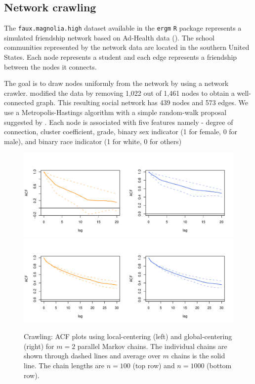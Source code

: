 \documentclass[12pt]{article}
\theoremstyle{remark}
\begin{document}
\subsection{Network crawling}


The \texttt{faux.magnolia.high} dataset available in the \texttt{ergm} \texttt{R} package represents a simulated friendship network based on Ad-Health data (\cite{resnick1997protecting}). The school communities represented by the network data are located in the southern United States. Each node represents a student and each edge represents a friendship between the nodes it connects.

The goal is to draw nodes uniformly from the network by using a network crawler. \cite{nilakanta2019ensuring} modified the data by removing 1,022 out of 1,461 nodes to obtain a well-connected graph. This resulting social network has 439 nodes and 573 edges. We use a Metropolis-Hastings algorithm with a simple random-walk  proposal suggested by \cite{gjoka2011practical}. Each node is associated with five features namely - degree of connection, cluster coefficient, grade, binary sex indicator (1 for female, 0 for male), and binary race indicator (1 for white, 0 for others)

\begin{figure}[htbp]
    \centering
      \includegraphics[width = .6\textwidth]{plots/magnolia-acf_n100.pdf}\\ \vspace{-.5cm}
      \includegraphics[width = .6\textwidth]{plots/magnolia-acf_n1000.pdf}

    \caption{Crawling:  ACF plots using local-centering (left) and global-centering (right) for $m=2$ parallel Markov chains. The individual chains are shown through dashed lines and average over $m$ chains is the solid line. The chain lengths are $n = 100$ (top row) and $n = 1000$ (bottom row).}
    \label{fig:magnolia-acf}
\end{figure}
\end{document}
